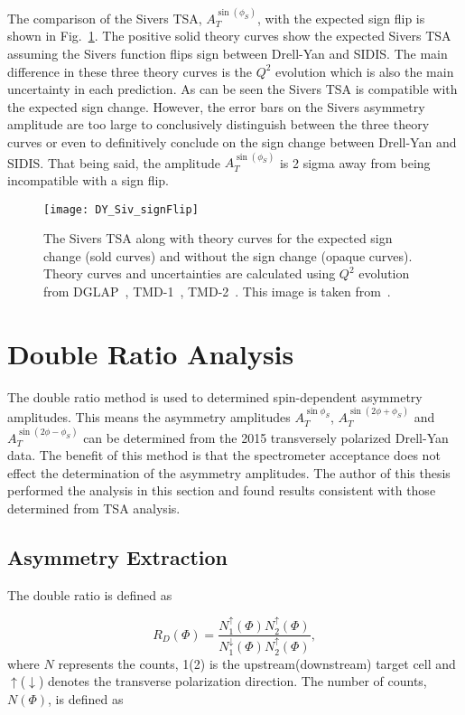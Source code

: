 The comparison of the Sivers TSA, $A_T^{\sin(\phi_S)}$, with the expected sign
flip is shown in Fig.~\ref{fig::DY_Siv_signFlip}.  The positive solid theory
curves show the expected Sivers TSA assuming the Sivers function flips sign
between Drell-Yan and SIDIS.  The main difference in these three theory curves
is the $Q^2$ evolution which is also the main uncertainty in each prediction.
As can be seen the Sivers TSA is compatible with the expected sign change.
However, the error bars on the Sivers asymmetry amplitude are too large to
conclusively distinguish between the three theory curves or even to definitively
conclude on the sign change between Drell-Yan and SIDIS.  That being said, the
amplitude $A_T^{\sin(\phi_S)}$ is 2 sigma away from being incompatible with a
sign flip.

\begin{figure}[h!t]
  \centering \texttt{[image: DY\_Siv\_signFlip]}
  \caption{The Sivers TSA along with theory curves for the expected sign change
    (sold curves) and without the sign change (opaque curves).  Theory curves
    and uncertainties are calculated using $Q^2$ evolution from
    DGLAP~\cite{Anselmino:2016uie}, TMD-1~\cite{Echevarria:2014xaa},
    TMD-2~\cite{Sun:2013hua}.  This image is taken from~\cite{compassDYpaper}.}
  \label{fig::DY_Siv_signFlip}
\end{figure}


\section{Double Ratio Analysis} \label{sec::doubleratio}
The double ratio method is used to determined spin-dependent asymmetry
amplitudes.  This means the asymmetry amplitudes $A^{\sin\phi_S}_T$,
$A^{\sin(2\phi+\phi_S)}_T$ and $A^{\sin(2\phi-\phi_S)}_T$ can be determined from
the 2015 transversely polarized Drell-Yan data.  The benefit of this method is
that the spectrometer acceptance does not effect the determination of the
asymmetry amplitudes.  The author of this thesis performed the analysis in this
section and found results consistent with those determined from TSA analysis.

\subsection{Asymmetry Extraction}
The double ratio is defined as

\begin{equation}
  R_D(\Phi) =
  \frac{N_1^{\uparrow}(\Phi)N_2^{\uparrow}(\Phi)}
       {N_1^{\downarrow}(\Phi)N_2^{\uparrow}(\Phi)},
\end{equation}
\noindent
where $N$ represents the counts, 1(2) is the upstream(downstream) target cell
and $\uparrow$($\downarrow$) denotes the transverse polarization direction.  The
number of counts, $N(\Phi)$, is defined as

